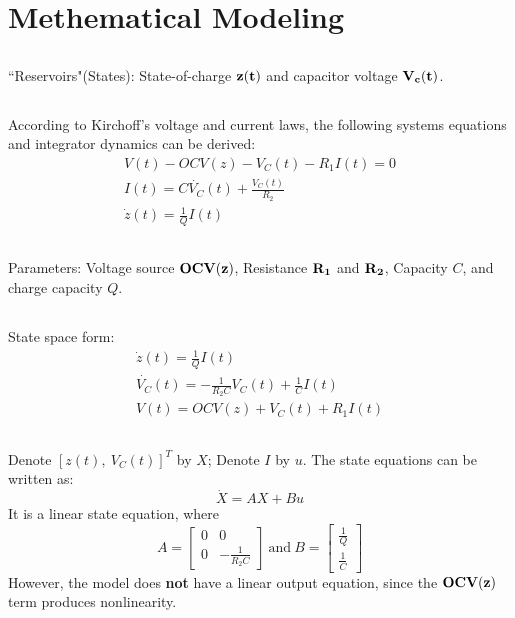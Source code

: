 \documentclass[12pt]{article}
\begin{document}
\section{Methematical Modeling}
\subsection{}
``Reservoirs"(States): State-of-charge $\bf{z(t)}$ and capacitor voltage $\bf{V_c(t)}$.
\subsection{}
According to Kirchoff's voltage and current laws, the following systems equations and integrator dynamics can be derived:
\begin{eqnarray}
V(t)-OCV(z)-V_C(t)-R_1I(t)=0\\
I(t)=C\dot{V_C}(t)+\frac{V_C(t)}{R_2}\\
\dot{z}(t)=\frac{1}{Q}I(t)
\end{eqnarray}
\subsection{}
Parameters: Voltage source $\bf{OCV(z)}$, Resistance $\bf{R_1}$ and $\bf{R_2}$, Capacity $C$, and charge capacity $Q$.
\subsection{}
State space form:
\begin{eqnarray}
\dot{z}(t)=\frac{1}{Q}I(t)\\
\dot{V_C}(t)=-\frac{1}{R_2C}V_C(t)+\frac{1}{C}I(t)\\
V(t)=OCV(z)+V_C(t)+R_1I(t)\label{eq:out}
\end{eqnarray}
\subsection{}
Denote $[z(t),\ V_C(t)]^T$ by $X$; Denote $I$ by $u$. The state equations can be written as:
\begin{equation}
\dot{X}=AX+Bu
\end{equation}
It is a linear state equation, where
\begin{equation*}
A=\left[
\begin{array}{cc}
0 & 0\\
0 & -\frac{1}{R_2C} 
\end{array}\right]\ \text{and}\ B=\left[
\begin{array}{c}
\frac{1}{Q}\\
\frac{1}{C}
\end{array}\right]
\end{equation*}
However, the model does \textbf{not} have a linear output equation, since the $\bf{OCV(z)}$ term produces nonlinearity.
\end{document}
